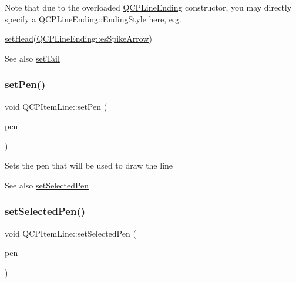 Note that due to the overloaded \mbox{\hyperlink{class_q_c_p_line_ending}{Q\+C\+P\+Line\+Ending}} constructor, you may directly specify a \mbox{\hyperlink{class_q_c_p_line_ending_a5ef16e6876b4b74959c7261d8d4c2cd5}{Q\+C\+P\+Line\+Ending\+::\+Ending\+Style}} here, e.\+g.
\begin{DoxyCode}
\mbox{\hyperlink{class_q_c_p_item_line_aebf3d687114d584e0459db6759e2c3c3}{setHead}}(\mbox{\hyperlink{class_q_c_p_line_ending_a5ef16e6876b4b74959c7261d8d4c2cd5ab9964d0d03f812d1e79de15edbeb2cbf}{QCPLineEnding::esSpikeArrow}}) 
\end{DoxyCode}


\begin{DoxySeeAlso}{See also}
\mbox{\hyperlink{class_q_c_p_item_line_ac264222c3297a7efe33df9345c811a5f}{set\+Tail}} 
\end{DoxySeeAlso}
\mbox{\label{class_q_c_p_item_line_a572528dab61c1abe205822fbd5db4b27}} 
\subsubsection{\texorpdfstring{set\+Pen()}{setPen()}}
{\footnotesize\ttfamily void Q\+C\+P\+Item\+Line\+::set\+Pen (\begin{DoxyParamCaption}\item[{const Q\+Pen \&}]{pen }\end{DoxyParamCaption})}

Sets the pen that will be used to draw the line

\begin{DoxySeeAlso}{See also}
\mbox{\hyperlink{class_q_c_p_item_line_a3e2fec44503277e77717e9c24f87f1ea}{set\+Selected\+Pen}} 
\end{DoxySeeAlso}
\mbox{\label{class_q_c_p_item_line_a3e2fec44503277e77717e9c24f87f1ea}} 
\subsubsection{\texorpdfstring{set\+Selected\+Pen()}{setSelectedPen()}}
{\footnotesize\ttfamily void Q\+C\+P\+Item\+Line\+::set\+Selected\+Pen (\begin{DoxyParamCaption}\item[{const Q\+Pen \&}]{pen }\end{DoxyParamCaption})}

